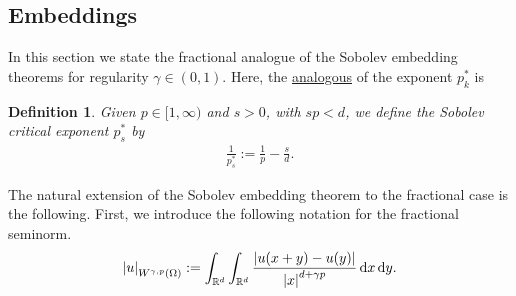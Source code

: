 \documentclass[
    a4paper,
    DIV=14,
    abstract=true,
    numbers=noenddot
]
{scrartcl}
\newtheorem{definition}[theorem]{Definition}
\theoremstyle{definition}
\renewcommand{\d}{\,\mathrm{d}}\newcommand{\dx}{\,\mathrm{d}x}
\newcommand{\R}{\mathbb{R}}
\begin{document}
\subsection{Embeddings}
In this section we state the fractional analogue of the Sobolev embedding theorems for regularity $\gamma \in (0,1)$.
Here, the \href{https://nowheredifferentiable.com/2023-07-12-PDEs-3-Sobolev_spaces/#global:~:text=concludes%20the%20proof.%C2%A0%E2%97%BB-,Exercise,-24%20.%20Given}{analogous} of the exponent $p_k^{*}$ is
\begin{definition}
  Given $p \in [1,\infty)$ and $s>0$, with $s p<d$, we define the \emph{Sobolev critical exponent} $p_s^*$ by
  \begin{align*}
    \frac{1}{p_s ^*}:=\frac{1}{p}-\frac{s }{d}.
  \end{align*}
\end{definition}
The natural extension of the Sobolev embedding theorem to the fractional case is the following. First, we introduce the following notation for the fractional seminorm.
\begin{align*}
  \abs{u}_{W^{\gamma, p}(\Omega )}:=\int_{\R^d}\int_{\R^d}\frac{\abs{u(x+y)-u(y)}}{\abs{x}^{d+\gamma p}}\d x \d y.
\end{align*}
\end{document}
